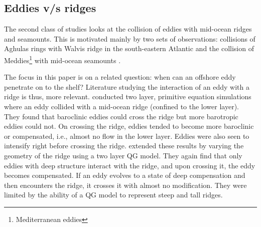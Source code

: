 \subsection{Eddies v/s ridges}
\label{sec-1-3}
\label{sec:introseamount}
The second class of studies looks at the collision of eddies with mid-ocean ridges and seamounts. This is motivated mainly by two sets of observations: collisions of Aghulas rings with Walvis ridge in the south-eastern Atlantic \citep[for e.g.,][]{Baker-Yeboah2010} and the collision of Meddies\footnote{Mediterranean eddies} with mid-ocean seamounts \citep{Richardson2000}.

The focus in this paper is on a related question: when can an offshore eddy penetrate on to the shelf? Literature studying the interaction of an eddy with a ridge is thus, more relevant. \cite{Kamenkovich1996} conducted two layer, primitive equation simulations where an eddy collided with a mid-ocean ridge (confined to the lower layer). They found that baroclinic eddies could cross the ridge but more barotropic eddies could not. On crossing the ridge, eddies tended to become more baroclinic or compensated, i.e., almost no flow in the lower layer. Eddies were also seen to intensify right before crossing the ridge. \cite{Beismann1999} extended these results by varying the geometry of the ridge using a two layer QG model. They again find that only eddies with deep structure interact with the ridge, and upon crossing it, the eddy becomes compensated. If an eddy evolves to a state of deep compensation and then encounters the ridge, it crosses it with almost no modification. They were limited by the ability of a QG model to represent steep and tall ridges.

